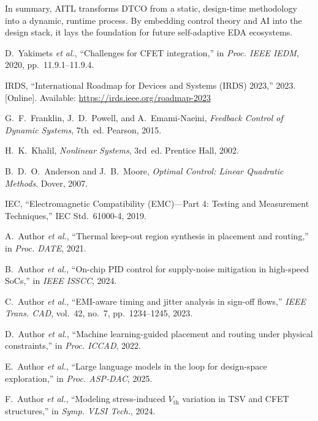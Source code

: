 \documentclass[conference]{IEEEtran}
\newcommand{\etal}{\textit{et al.}}
\begin{document}
In summary, AITL transforms DTCO from a static, design-time methodology into a dynamic, runtime process. By embedding control theory and AI into the design stack, it lays the foundation for future self-adaptive EDA ecosystems.

\begin{thebibliography}{99}

D.~Yakimets \etal, ``Challenges for CFET integration,'' in \emph{Proc. IEEE IEDM}, 2020, pp.~11.9.1--11.9.4.

IRDS, ``International Roadmap for Devices and Systems (IRDS) 2023,'' 2023. [Online]. Available: \url{https://irds.ieee.org/roadmap-2023}

G.~F.~Franklin, J.~D.~Powell, and A.~Emami-Naeini, \emph{Feedback Control of Dynamic Systems}, 7th~ed. Pearson, 2015.

H.~K.~Khalil, \emph{Nonlinear Systems}, 3rd~ed. Prentice Hall, 2002.

B.~D.~O.~Anderson and J.~B.~Moore, \emph{Optimal Control: Linear Quadratic Methods}. Dover, 2007.

IEC, ``Electromagnetic Compatibility (EMC)---Part 4: Testing and Measurement Techniques,'' IEC Std.~61000-4, 2019.

A.~Author \etal, ``Thermal keep-out region synthesis in placement and routing,'' in \emph{Proc. DATE}, 2021.

B.~Author \etal, ``On-chip PID control for supply-noise mitigation in high-speed SoCs,'' in \emph{IEEE ISSCC}, 2024.

C.~Author \etal, ``EMI-aware timing and jitter analysis in sign-off flows,'' \emph{IEEE Trans. CAD}, vol.~42, no.~7, pp.~1234--1245, 2023.

D.~Author \etal, ``Machine learning-guided placement and routing under physical constraints,'' in \emph{Proc. ICCAD}, 2022.

E.~Author \etal, ``Large language models in the loop for design-space exploration,'' in \emph{Proc. ASP-DAC}, 2025.

F.~Author \etal, ``Modeling stress-induced $V_\mathrm{th}$ variation in TSV and CFET structures,'' in \emph{Symp. VLSI Tech.}, 2024.

\end{thebibliography}
\end{document}
